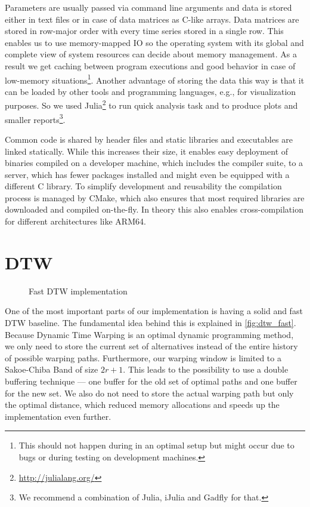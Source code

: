 Parameters are usually passed via command line arguments and data is stored either in text files or in case of data matrices as C-like arrays. Data matrices are stored in row-major order with every time series stored in a single row. This enables us to use memory-mapped IO so the operating system with its global and complete view of system resources can decide about memory management. As a result we get caching between program executions and good behavior in case of low-memory situations\footnote{This should not happen during in an optimal setup but might occur due to bugs or during testing on development machines.}. Another advantage of storing the data this way is that it can be loaded by other tools and programming languages, e.g., for visualization purposes. So we used Julia\footnote{\url{http://julialang.org/}} to run quick analysis task and to produce plots and smaller reports\footnote{We recommend a combination of Julia, iJulia and Gadfly for that.}.

Common code is shared by header files and static libraries and executables are linked statically. While this increases their size, it enables easy deployment of binaries compiled on a developer machine, which includes the compiler suite, to a server, which has fewer packages installed and might even be equipped with a different C library. To simplify development and reusability the compilation process is managed by CMake, which also ensures that most required libraries are downloaded and compiled on-the-fly. In theory this also enables cross-compilation for different architectures like ARM64.



\section{DTW}
\label{sec:implementation:dtw}

\begin{figure}
    \centering
    
    \caption[Illustration of fast DTW implementation]{Fast DTW implementation}\label{fig:dtw_fast}
\end{figure}

One of the most important parts of our implementation is having a solid and fast DTW baseline. The fundamental idea behind this is explained in \autoref{fig:dtw_fast}. Because Dynamic Time Warping is an optimal dynamic programming method, we only need to store the current set of alternatives instead of the entire history of possible warping paths. Furthermore, our warping window is limited to a Sakoe-Chiba Band of size $2r + 1$. This leads to the possibility to use a double buffering technique --- one buffer for the old set of optimal paths and one buffer for the new set. We also do not need to store the actual warping path but only the optimal distance, which reduced memory allocations and speeds up the implementation even further.


